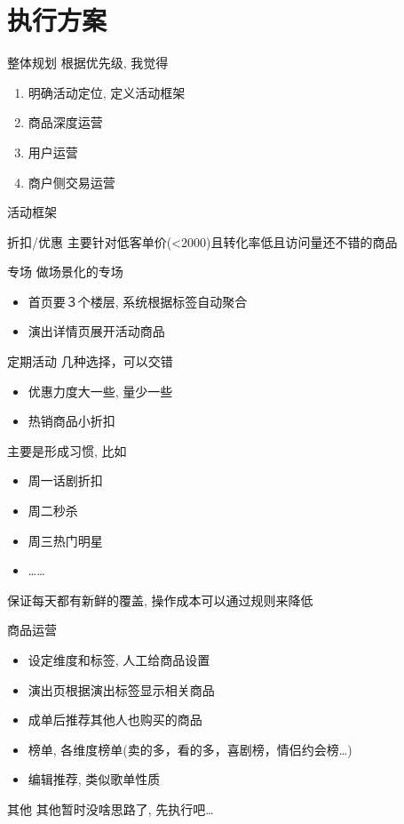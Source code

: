 \documentclass[presentation,bigger]{beamer}
\begin{document}
\section{执行方案}
\label{sec:orgheadline18}
\begin{frame}[label={sec:orgheadline15}]{整体规划}
根据优先级, 我觉得
\begin{enumerate}
\item 明确活动定位, 定义活动框架
\item 商品深度运营
\item 用户运营
\item 商户侧交易运营
\end{enumerate}
\end{frame}

\begin{frame}[allowframebreaks]{活动框架}
\begin{block}{折扣/优惠}
主要针对低客单价(<2000)且转化率低且访问量还不错的商品
\end{block}

\begin{block}{专场}
做场景化的专场
\begin{itemize}
\item 首页要３个楼层, 系统根据标签自动聚合
\item 演出详情页展开活动商品
\end{itemize}
\end{block}

\framebreak

\begin{block}{定期活动}
几种选择，可以交错
\begin{itemize}
\item 优惠力度大一些, 量少一些
\item 热销商品小折扣
\end{itemize}
主要是形成习惯, 比如
\begin{itemize}
\item 周一话剧折扣
\item 周二秒杀
\item 周三热门明星
\item \dots{}\ldots{}
\end{itemize}
保证每天都有新鲜的覆盖, 操作成本可以通过规则来降低
\end{block}
\end{frame}


\begin{frame}[label={sec:orgheadline16}]{商品运营}
\begin{itemize}
\item 设定维度和标签, 人工给商品设置
\item 演出页根据演出标签显示相关商品
\item 成单后推荐其他人也购买的商品
\item 榜单, 各维度榜单(卖的多，看的多，喜剧榜，情侣约会榜\ldots{})
\item 编辑推荐, 类似歌单性质
\end{itemize}
\end{frame}

\begin{frame}[label={sec:orgheadline17}]{其他}
其他暂时没啥思路了, 先执行吧\ldots{}
\end{frame}
\end{document}
